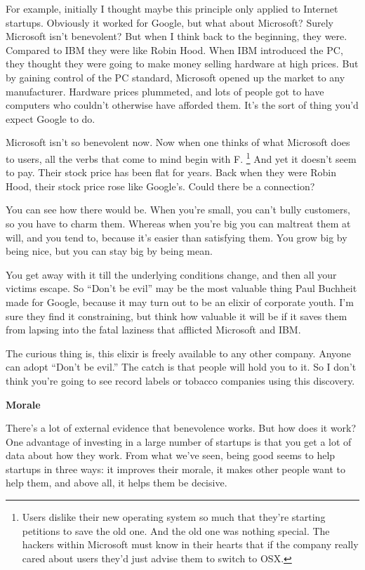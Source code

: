 For example, initially I thought maybe this principle only applied to
Internet startups. Obviously it worked for Google, but what about
Microsoft? Surely Microsoft isn't benevolent? But when I think back to
the beginning, they were. Compared to IBM they were like Robin Hood.
When IBM introduced the PC, they thought they were going to make money
selling hardware at high prices. But by gaining control of the PC
standard, Microsoft opened up the market to any manufacturer. Hardware
prices plummeted, and lots of people got to have computers who couldn't
otherwise have afforded them. It's the sort of thing you'd expect Google
to do.

Microsoft isn't so benevolent now. Now when one thinks of what Microsoft
does to users, all the verbs that come to mind begin with F.
\footnote{Users dislike their new operating system so much that they're
starting petitions to save the old one. And the old one was nothing
special. The hackers within Microsoft must know in their hearts that if
the company really cared about users they'd just advise them to switch
to OSX.} And yet it doesn't seem to pay. Their stock
price has been flat for years. Back when they were Robin Hood, their
stock price rose like Google's. Could there be a connection?

You can see how there would be. When you're small, you can't bully
customers, so you have to charm them. Whereas when you're big you can
maltreat them at will, and you tend to, because it's easier than
satisfying them. You grow big by being nice, but you can stay big by
being mean.

You get away with it till the underlying conditions change, and then all
your victims escape. So ``Don't be evil'' may be the most valuable thing
Paul Buchheit made for Google, because it may turn out to be an elixir
of corporate youth. I'm sure they find it constraining, but think how
valuable it will be if it saves them from lapsing into the fatal
laziness that afflicted Microsoft and IBM.

The curious thing is, this elixir is freely available to any other
company. Anyone can adopt ``Don't be evil.'' The catch is that people
will hold you to it. So I don't think you're going to see record labels
or tobacco companies using this discovery.

\textbf{Morale}

There's a lot of external evidence that benevolence works. But how does
it work? One advantage of investing in a large number of startups is
that you get a lot of data about how they work. From what we've seen,
being good seems to help startups in three ways: it improves their
morale, it makes other people want to help them, and above all, it helps
them be decisive.

